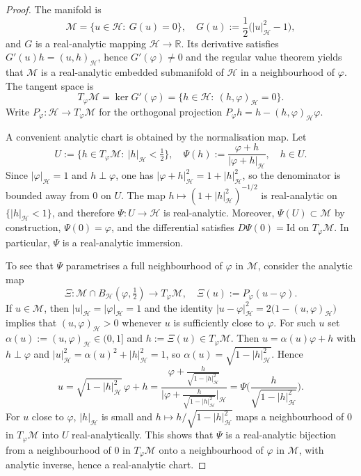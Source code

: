 \documentclass[reqno]{amsart}
\begin{document}
\begin{proof}
The manifold is
\[
\mathcal M=\{u\in \mathcal H:\ G(u)=0\},\quad G(u)
:=\frac12\bigl(|u|_{\mathcal H}^{2}-1\bigr),
\]
and $G$ is a real-analytic mapping $\mathcal H\to\mathbb R$. Its derivative satisfies
$G'(u)h=(u,h)_{\mathcal H}$, hence $G'(\varphi)\neq 0$ and the regular value theorem
yields that
$\mathcal M$ is a real-analytic embedded submanifold of $\mathcal H$ in a
neighbourhood of
$\varphi$. The tangent space is
\[
T_\varphi\mathcal M=\ker G'(\varphi)=\{h\in\mathcal H:\ (h,\varphi)_{\mathcal H}=0\}.
\]
Write $P_\varphi:\mathcal H\to T_\varphi\mathcal M$ for the orthogonal projection
$P_\varphi h=h-(h,\varphi)_{\mathcal H}\varphi$.

A convenient analytic chart is obtained by the normalisation map. Let
\[
U:=\{h\in T_\varphi\mathcal M:\ |h|_{\mathcal H}<\tfrac12\},
\quad
\Psi(h):=\frac{\varphi+h}{|\varphi+h|_{\mathcal H}},\quad h\in U.
\]
Since $|\varphi|_{\mathcal H}=1$ and $h\perp \varphi$, one has
$|\varphi+h|_{\mathcal H}^{2}=1+|h|_{\mathcal H}^{2}$, so the denominator is bounded
away from
$0$ on $U$. The map $h\mapsto (1+|h|_{\mathcal H}^{2})^{-1/2}$ is real-analytic on
$\{|h|_{\mathcal H}<1\}$, and therefore $\Psi:U\to\mathcal H$ is real-analytic.
Moreover,
$\Psi(U)\subset\mathcal M$ by construction, $\Psi(0)=\varphi$, and the differential
satisfies
$D\Psi(0)=\mathrm{Id}$ on $T_\varphi\mathcal M$. In particular, $\Psi$ is a
real-analytic immersion.

To see that $\Psi$ parametrises a full neighbourhood of $\varphi$ in $\mathcal M$,
consider the analytic map
\[
\Xi:\mathcal M\cap B_{\mathcal H}(\varphi,\tfrac12)\to T_\varphi\mathcal M,
\quad
\Xi(u):=P_\varphi(u-\varphi).
\]
If $u\in\mathcal M$, then $|u|_{\mathcal H}=|\varphi|_{\mathcal H}=1$ and the identity
$|u-\varphi|_{\mathcal H}^{2}=2\bigl(1-(u,\varphi)_{\mathcal H}\bigr)$ implies that
$(u,\varphi)_{\mathcal H}>0$ whenever $u$ is sufficiently close to $\varphi$. For such $u$ set
$\alpha(u):=(u,\varphi)_{\mathcal H}\in(0,1]$ and $h:=\Xi(u)\in T_\varphi\mathcal M$.
Then
$u=\alpha(u)\varphi+h$ with $h\perp\varphi$ and
$|u|_{\mathcal H}^{2}=\alpha(u)^{2}+|h|_{\mathcal H}^{2}=1$,
so $\alpha(u)=\sqrt{1-|h|_{\mathcal H}^{2}}$. Hence
\[
u=\sqrt{1-|h|_{\mathcal H}^{2}}\,\varphi+h
=\frac{\varphi+\frac{h}{\sqrt{1-|h|_{\mathcal H}^{2}}}}
{\big|\varphi+\frac{h}{\sqrt{1-|h|_{\mathcal H}^{2}}}\big|_{\mathcal H}}
=\Psi\Big(\frac{h}{\sqrt{1-|h|_{\mathcal H}^{2}}}\Big).
\]
For $u$ close to $\varphi$, $|h|_{\mathcal H}$ is small and
$h\mapsto h/\sqrt{1-|h|_{\mathcal H}^{2}}$ maps a neighbourhood of $0$ in
$T_\varphi\mathcal M$
into $U$ real-analytically. This shows that $\Psi$ is a real-analytic bijection from a
neighbourhood of $0$ in $T_\varphi\mathcal M$ onto a neighbourhood of $\varphi$
in $\mathcal M$,
with analytic inverse, hence a real-analytic chart.


\end{proof}
\end{document}
